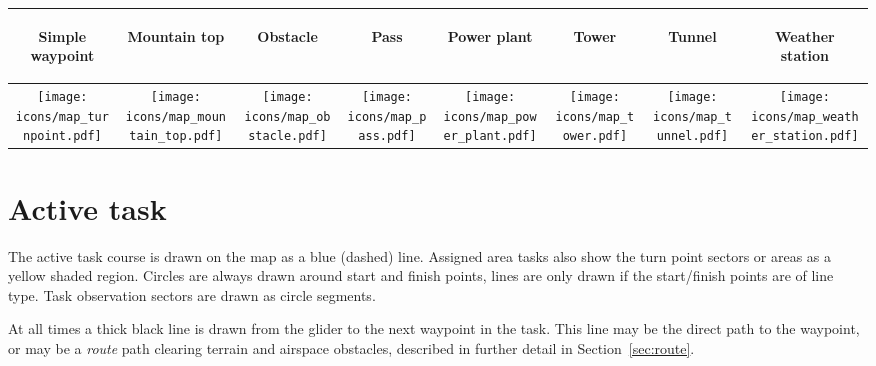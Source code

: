 \begin{center}
\vspace{2cm}
\begin{tabular}{cc|cc|cc|cc}
\begin{rotate}{60}Simple waypoint\end{rotate} &
\begin{rotate}{60}Mountain top\end{rotate} &
\begin{rotate}{60}Obstacle\end{rotate} &
\begin{rotate}{60}Pass\end{rotate} &
\begin{rotate}{60}Power plant\end{rotate} &
\begin{rotate}{60}Tower\end{rotate} &
\begin{rotate}{60}Tunnel\end{rotate} &
\begin{rotate}{60}Weather station\end{rotate}\\
\hline
\texttt{[image: icons/map\_turnpoint.pdf]} &
\texttt{[image: icons/map\_mountain\_top.pdf]} &
\texttt{[image: icons/map\_obstacle.pdf]} &
\texttt{[image: icons/map\_pass.pdf]} &
\texttt{[image: icons/map\_power\_plant.pdf]} &
\texttt{[image: icons/map\_tower.pdf]} &
\texttt{[image: icons/map\_tunnel.pdf]} &
\texttt{[image: icons/map\_weather\_station.pdf]}\\
\hline
\end{tabular}
\end{center}


\section{Active task}

The active task course is drawn on the map as a blue (dashed) line.
Assigned area tasks also show the turn point sectors or areas as a yellow shaded
region.
Circles are always drawn around start and finish points, lines are
only drawn if the start/finish points are of line type.  Task
observation sectors are drawn as circle segments.

At all times a thick black line is drawn from the glider to the next
waypoint in the task.  This line may be the direct path to the waypoint,
or may be a {\em route} path clearing terrain and airspace obstacles, described in
further detail in Section~\ref{sec:route}.

